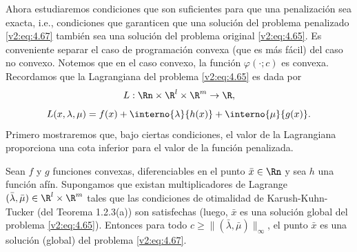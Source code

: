 Ahora estudiaremos condiciones que son suficientes para que una penalización sea exacta, i.e., condiciones que garanticen que una solución del problema penalizado \eqref{v2:eq:4.67} también sea una solución del problema original \eqref{v2:eq:4.65}. Es conveniente separar el caso de programación convexa (que es más fácil) del caso no convexo. Notemos que en el caso convexo, la función $\varphi(\cdot; c)$ es convexa. Recordamos que la Lagrangiana del problema \eqref{v2:eq:4.65} es dada por
\[
    L : \Rn \times \R^l \times \R^m \to \R,
\]
\[
    L(x, \lambda, \mu) = f(x) + \interno{\lambda}{h(x)} + \interno{\mu}{g(x)}.
\]
Primero mostraremos que, bajo ciertas condiciones, el valor de la Lagrangiana proporciona una cota inferior para el valor de la función penalizada.

\begin{theorem}\label{v2:thm:4.3.5}
    Sean $f$ y $g$ funciones convexas, diferenciables en el punto $\bar{x} \in \Rn$ y sea $h$ una función afín. Supongamos que existan multiplicadores de Lagrange $(\bar{\lambda}, \bar{\mu}) \in \R^l \times \R^m$ tales que las condiciones de otimalidad de Karush-Kuhn-Tucker (del Teorema 1.2.3(a)) son satisfechas (luego, $\bar{x}$ es una solución global del problema \eqref{v2:eq:4.65}).
    Entonces para todo $c \ge \|(\bar{\lambda}, \bar{\mu})\|_\infty$, el punto $\bar{x}$ es una solución (global) del problema \eqref{v2:eq:4.67}.
\end{theorem}

